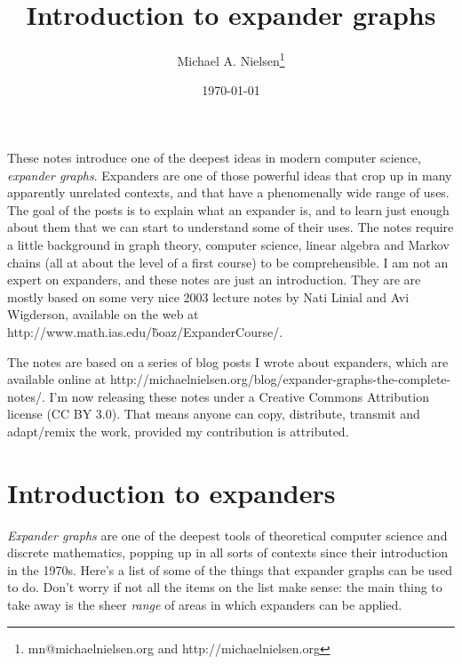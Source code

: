 \documentclass[12pt]{article}
\begin{document}
\title{Introduction to expander graphs} 

\author{Michael A. Nielsen\thanks{mn@michaelnielsen.org and
  http://michaelnielsen.org}}

\date{\today}

\maketitle

These notes introduce one of the deepest ideas in modern computer
science, \emph{expander graphs}.  Expanders are one of those powerful
ideas that crop up in many apparently unrelated contexts, and that
have a phenomenally wide range of uses.  The goal of the posts is to
explain what an expander is, and to learn just enough about them that
we can start to understand some of their uses.  The notes require a
little background in graph theory, computer science, linear algebra
and Markov chains (all at about the level of a first course) to be
comprehensible.  I am not an expert on expanders, and these notes are
just an introduction.  They are are mostly based on some very nice
2003 lecture notes by Nati Linial and Avi Wigderson, available on the
web at http://www.math.ias.edu/\~boaz/ExpanderCourse/.

The notes are based on a series of blog posts I wrote about expanders,
which are available online at
http://michaelnielsen.org/blog/expander-graphs-the-complete-notes/.
I'm now releasing these notes under a Creative Commons Attribution
license (CC BY 3.0).  That means anyone can copy, distribute, transmit
and adapt/remix the work, provided my contribution is attributed.

\section{Introduction to expanders}

\emph{Expander graphs} are one of the deepest tools of theoretical
computer science and discrete mathematics, popping up in all sorts of
contexts since their introduction in the 1970s.  Here's a list of some
of the things that expander graphs can be used to do.  Don't worry if
not all the items on the list make sense: the main thing to take away
is the sheer \emph{range} of areas in which expanders can be applied.
\end{document}
